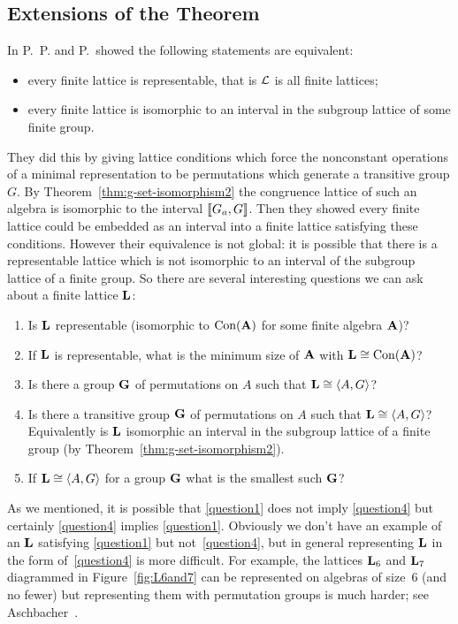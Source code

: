 \subsection{Extensions of the \Palfy \Pudlak Theorem}
In \cite{PalfyPudlak1980} P.~P. \Palfy and P.~\Pudlak showed the
following statements are equivalent:
\begin{itemize}
\item
every finite lattice is representable, that is $\mathcal{L}$ is all
finite lattices;
\item
every finite lattice is isomorphic to an 
interval in the subgroup lattice of some finite group.
\end{itemize}
They did this by giving lattice conditions which force the
nonconstant operations of a minimal
representation to be permutations which generate a transitive
group $G$.
By Theorem~\ref{thm:g-set-isomorphism2}
the congruence lattice of such an algebra is isomorphic to 
the interval $\llbracket G_a,G \rrbracket$. 
Then they showed every finite lattice could be embedded 
as an interval into a finite lattice satisfying these conditions.
However their equivalence is not global: it is possible that there 
is a representable lattice which is not isomorphic to an interval
of the subgroup lattice of a finite group. So there are several 
interesting questions we can ask about a finite lattice
$\mathbf{L}$:
\begin{enumerate}
\item\label{question1}
Is $\mathbf{L}$ representable (isomorphic to $\operatorname{Con}(\mathbf{A})$ for some finite algebra $\mathbf{A}$)?
\item\label{question2}
If $\mathbf{L}$ is representable, what is the minimum size of $\mathbf{A}$ with $\mathbf{L} \cong\operatorname{Con}(\mathbf{A})$?
\item\label{question3}
Is there a group $\mathbf{G}$ of permutations on $A$ such that $\mathbf{L} \cong \langle A,G\rangle$?
\item\label{question4}
Is there a transitive group $\mathbf{G}$ of permutations on $A$ such that $\mathbf{L} \cong \langle A,G\rangle$?
Equivalently is $\mathbf{L}$ isomorphic an interval in the subgroup lattice of a finite group
(by Theorem~\ref{thm:g-set-isomorphism2}).
\item\label{question5}
If $\mathbf{L} \cong \langle A,G\rangle$ for a group $\mathbf{G}$ what is the smallest such $\mathbf{G}$?
\end{enumerate}
As we mentioned, it is possible that \eqref{question1} does not imply \eqref{question4} 
but certainly \eqref{question4} implies \eqref{question1}. Obviously we don't have 
an example of an $\mathbf{L}$ satisfying \eqref{question1} but not~\eqref{question4}, but 
in general representing $\mathbf{L}$ 
in the form of~\eqref{question4}
is more difficult. For example,
the lattices $\mathbf{L}_6$ and $\mathbf{L}_7$ diagrammed in Figure~\ref{fig:L6and7}
can be represented on algebras of size~6 (and no fewer)
but representing them with permutation groups is much harder; 
see Aschbacher~\cite{Aschbacher2008}.

